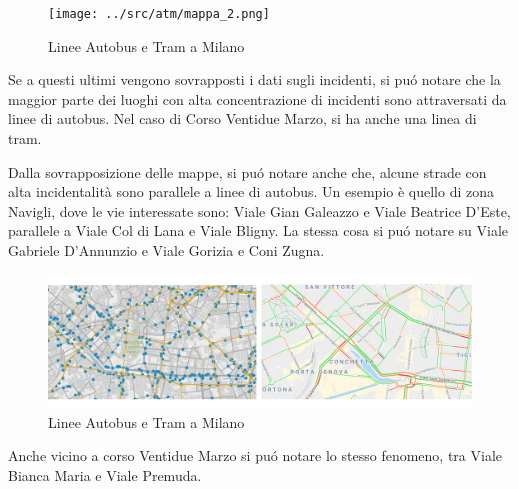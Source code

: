 \documentclass[a4paper]{report}
\begin{document}
\begin{figure}
    \texttt{[image: ../src/atm/mappa\_2.png]}
    \caption{Linee Autobus e Tram a Milano}
    \label{fig:geo_trasporti}
\end{figure}


Se a questi ultimi vengono sovrapposti i dati sugli incidenti, 
si pu\'o notare che la maggior parte dei luoghi con alta concentrazione di incidenti sono 
attraversati da linee di autobus. Nel caso di Corso Ventidue Marzo, si ha anche una linea di tram.




Dalla sovrapposizione delle mappe, si pu\'o notare anche che, alcune strade con alta incidentalità 
sono parallele a linee di autobus. Un esempio è quello di zona Navigli, 
dove le vie interessate sono:
Viale Gian Galeazzo e Viale Beatrice D'Este, parallele a Viale Col di Lana e Viale Bligny.
La stessa cosa si pu\'o notare su Viale Gabriele D'Annunzio e Viale Gorizia e Coni Zugna.

\begin{figure}
    \includegraphics[width=\linewidth]{../src/atm/navigli.png}
    \caption{Linee Autobus e Tram a Milano}
    \label{fig:navigli}
\end{figure}


Anche vicino a corso Ventidue Marzo si pu\'o notare lo stesso fenomeno, 
tra Viale Bianca Maria e Viale Premuda.
\end{document}
